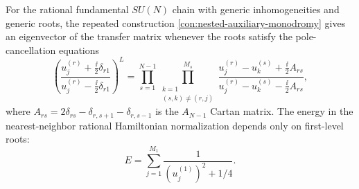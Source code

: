 \begin{theorem}
\label{thm:recursive-nested-bethe-origin}
For the rational fundamental \(SU(N)\) chain with generic inhomogeneities and
generic roots, the repeated construction
\ref{con:nested-auxiliary-monodromy} gives an eigenvector of the transfer
matrix whenever the roots satisfy the pole-cancellation equations
\begin{equation}
  \left(
    \frac{u_j^{(r)}+\frac{\ii}{2}\delta_{r1}}
         {u_j^{(r)}-\frac{\ii}{2}\delta_{r1}}
  \right)^L
  =
  \prod_{s=1}^{N-1}
  \prod_{\substack{k=1\\(s,k)\ne(r,j)}}^{M_s}
  \frac{u_j^{(r)}-u_k^{(s)}+\frac{\ii}{2}A_{rs}}
       {u_j^{(r)}-u_k^{(s)}-\frac{\ii}{2}A_{rs}},
  \label{eq:su-n-nested-bethe-cartan}
\end{equation}
where \(A_{rs}=2\delta_{rs}-\delta_{r,s+1}-\delta_{r,s-1}\) is the
\(A_{N-1}\) Cartan matrix.  The energy in the nearest-neighbor rational
Hamiltonian normalization depends only on first-level roots:
\begin{equation}
  E=\sum_{j=1}^{M_1}\frac{1}{(u_j^{(1)})^2+1/4}.
  \label{eq:su-n-rational-energy-first-level}
\end{equation}
\end{theorem}

